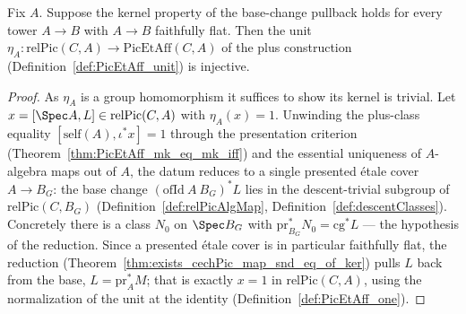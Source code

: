 \begin{theorem}
  \label{thm:PicEtAff_unit_injective_of_ker}
  \leanok
  Fix \(A\).  Suppose the kernel property of the base-change pullback holds for every tower \(A
  \to B\) with \(A \to B\) faithfully flat.  Then the unit \(\eta_A \colon \mathrm{relPic}(C,A)
  \to \mathrm{PicEtAff}(C,A)\) of the plus construction (Definition~\ref{def:PicEtAff_unit}) is
  injective.
\end{theorem}
\begin{proof}
  \leanok
  As \(\eta_A\) is a group homomorphism it suffices to show its kernel is trivial.  Let \(x =
  [\Spec A, L] \in \mathrm{relPic}(C,A)\) with \(\eta_A(x) = 1\).  Unwinding the plus-class
  equality \([\mathrm{self}(A), \iota^{*}x] = 1\) through the presentation criterion
  (Theorem~\ref{thm:PicEtAff_mk_eq_mk_iff}) and the essential uniqueness of \(A\)-algebra maps
  out of \(A\), the datum reduces to a single presented \'etale cover \(A \to B_G\): the base
  change \((\mathrm{ofId}\ A\ B_G)^{*}L\) lies in the descent-trivial subgroup of
  \(\mathrm{relPic}(C,B_G)\) (Definition~\ref{def:relPicAlgMap},
  Definition~\ref{def:descentClasses}).  Concretely there is a class \(N_0\) on \(\Spec B_G\)
  with \(\mathrm{pr}_{B_G}^{*} N_0 = \mathrm{cg}^{*} L\) — the hypothesis of the reduction.  Since
  a presented \'etale cover is in particular faithfully flat, the reduction
  (Theorem~\ref{thm:exists_cechPic_map_snd_eq_of_ker}) pulls \(L\) back from the base, \(L =
  \mathrm{pr}_A^{*} M\); that is exactly \(x = 1\) in \(\mathrm{relPic}(C,A)\), using the
  normalization of the unit at the identity (Definition~\ref{def:PicEtAff_one}).
\end{proof}

